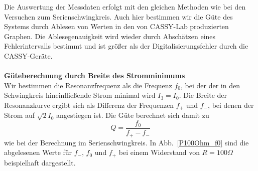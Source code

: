 \documentclass[12pt,a4paper]{article}
\begin{document}
Die Auswertung der Messdaten erfolgt mit den gleichen Methoden wie bei den Versuchen zum Serienschwingkreis. Auch hier bestimmen wir die Güte des Systems durch Ablesen von Werten in den von CASSY-Lab produzierten Graphen. Die Ablesegenauigkeit wird wieder durch Abschätzen eines Fehlerintervalls bestimmt und ist größer als der Digitalisierungsfehler durch die CASSY-Geräte.\\
\\
\textbf{Güteberechnung durch Breite des Stromminimums}\\
Wir bestimmen die Resonanzfrequenz als die Frequenz $f_0$, bei der der in den Schwingkreis hineinfließende Strom  minimal wird $I_3=I_0$. Die Breite der Resonanzkurve ergibt sich als Differenz der Frequenzen $f_+$ und $f_-$, bei denen der Strom auf $\sqrt{2}I_0$ angestiegen ist. Die Güte berechnet sich damit zu
\begin{equation}\label{eq:guete_ueber_f}
Q=\frac{f_0}{f_+-f_-}
\end{equation}
wie bei der Berechnung im Serienschwingkreis. In Abb.~\ref{P100Ohm_f0} sind die abgelesenen Werte für $f_-$, $f_0$ und $f_+$ bei einem Widerstand von $R=100\Omega$ beispielhaft dargestellt.
\end{document}
